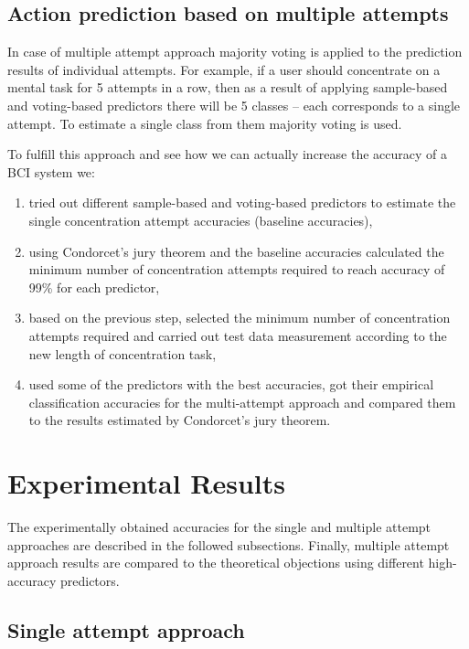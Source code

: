 \documentclass[12pt]{article}
\theoremstyle{definition}
\begin{document}
\subsection{Action prediction based on multiple attempts}
In case of multiple attempt approach majority voting  is applied to the prediction results of individual attempts. For example, if a user should concentrate on a mental task for 5 attempts in a row, then as a result of applying sample-based and voting-based predictors there will be 5 classes -- each corresponds to a single attempt. To estimate a single class from them majority voting is used.

To fulfill this approach and see how we can actually increase the accuracy of a BCI system we:
\begin{enumerate}
\item tried out different sample-based and voting-based predictors to estimate the single concentration attempt accuracies (baseline accuracies),
\item using Condorcet's jury theorem and the baseline accuracies calculated the minimum number of concentration attempts required to reach accuracy of 99\% for each predictor,
\item based on the previous step, selected the minimum number of concentration attempts required and carried out test data measurement according to the new length of concentration task,
\item used some of the predictors with the best accuracies, got their empirical classification accuracies for the multi-attempt approach and compared them to the results estimated by Condorcet's jury theorem.
\end{enumerate}

\newpage
\section{Experimental Results}

The experimentally obtained accuracies for the single and multiple attempt approaches are described in the followed subsections. Finally, multiple attempt approach results are compared to the theoretical objections using different high-accuracy predictors.

\subsection{Single attempt approach}
\end{document}
